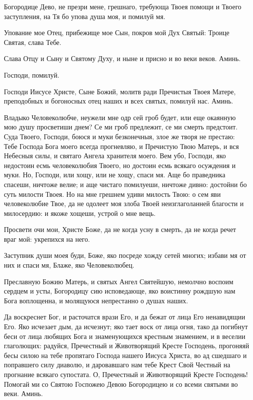 \begin{mymulticols}
Богородице Дево, не презри мене, грешнаго, требующа Твоея помощи и Твоего заступления, на Тя бо упова душа моя, и помилуй мя.


Упование мое Отец, прибежище мое Сын, покров мой Дух Святый: Троице Святая, слава Тебе.

\Chestneyshuyu

Слава Отцу и Сыну и Святому Духу, и ныне и присно и во веки веков. Аминь.

Господи, помилуй. 

Господи Иисусе Христе, Сыне Божий, молитв ради Пречистыя Твоея Матере, преподобных и богоносных отец наших и всех святых, помилуй нас. Аминь.


Владыко Человеколюбче, неужели мне одр сей гроб будет, или еще окаянную мою душу просветиши днем? Се ми гроб предлежит, се ми смерть предстоит. Суда Твоего, Господи, боюся и муки безконечныя, злое же творя не престаю: Тебе Господа Бога моего всегда прогневляю, и Пречистую Твою Матерь, и вся Небесныя силы, и святаго Ангела хранителя моего. Вем убо, Господи, яко недостоин есмь человеколюбия Твоего, но достоин есмь всякаго осуждения и муки. Но, Господи, или хощу, или не хощу, спаси мя. Аще бо праведника спасеши, ничтоже велие; и аще чистаго помилуеши, ничтоже дивно: достойни бо суть милости Твоея. Но на мне грешнем удиви милость Твою: о сем яви человеколюбие Твое, да не одолеет моя злоба Твоей неизглаголанней благости и милосердию: и якоже хощеши, устрой о мне вещь.

Просвети очи мои, Христе Боже, да не когда усну в смерть, да не когда речет враг мой: укрепихся на него.

\slavan

Заступник души моея буди, Боже, яко посреде хожду сетей многих; избави мя от них и спаси мя, Блаже, яко Человеколюбец.

\inynen

Преславную Божию Матерь, и святых Ангел Святейшую, немолчно воспоим сердцем и усты, Богородицу сию исповедающе, яко воистинну рождшую нам Бога воплощенна, и молящуюся непрестанно о душах наших.


Да воскреснет Бог, и расточатся врази Его, и да бежат от лица Его ненавидящии Его. Яко исчезает дым, да исчезнут; яко тает воск от лица огня, тако да погибнут беси от лица любящих Бога и знаменующихся крестным знамением, и в веселии глаголющих: радуйся, Пречестный и Животворящий Кресте Господень, прогоняяй бесы силою на тебе пропятаго Господа нашего Иисуса Христа, во ад сшедшаго и поправшего силу диаволю, и даровавшаго нам тебе Крест Свой Честный на прогнание всякаго супостата. О, Пречестный и Животворящий Кресте Господень! Помогай ми со Святою Госпожею Девою Богородицею и со всеми святыми во веки. Аминь.


\end{mymulticols}
